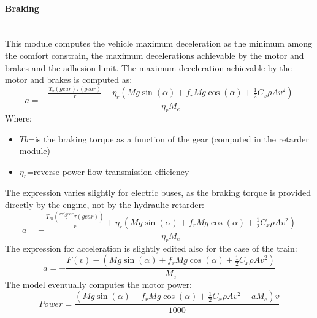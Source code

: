 \documentclass{article}
\newcommand{\subsubsubsection}[1]{\paragraph{#1}\mbox{}\\}
\begin{document}
\subsubsubsection{Braking}
This module computes the vehicle maximum deceleration as the minimum among the comfort constrain, the maximum decelerations achievable by the motor and brakes and the adhesion limit. The maximum deceleration achievable by the motor and brakes is computed as: 
\begin{equation}
a=-\frac{\frac{T_b(gear)\tau(gear)}{r}+\eta_r(Mg\sin(\alpha)+f_{r}Mg\cos(\alpha)+\frac{1}{2}C_{x}\rho Av^2)}{\eta_{r}M_{e}}
\end{equation}
Where:
\begin{itemize}
\item $Tb$=is the braking torque as a function of the gear (computed in the retarder module) 
\item $\eta_r$=reverse power flow transmission efficiency
\end{itemize}
The expression varies slightly for electric buses, as the braking torque is provided directly by the engine, not by the hydraulic retarder: 
\begin{equation}
a=-\frac{\frac{T_m(\frac{\nu \tau (gear}{r}\tau(gear))}{r}+\eta_r(Mg\sin(\alpha)+f_{r}Mg\cos(\alpha)+\frac{1}{2}C_{x}\rho Av^2)}{\eta_{r}M_{e}}
\end{equation}
The expression for acceleration is slightly edited also for the case of the train: 
\begin{equation}
a=-\frac{F(v)-(Mg\sin(\alpha)+f_{r}Mg\cos(\alpha)+\frac{1}{2}C_{x}\rho Av^2)}{M_{e}}
\end{equation}
The model eventually computes the motor power: 
\begin{equation}
Power=\frac{(Mg\sin(\alpha)+f_{r}Mg\cos(\alpha)+\frac{1}{2}C_{x}\rho Av^2+aM_{e})v}{1000}
\end{equation}
\end{document}
